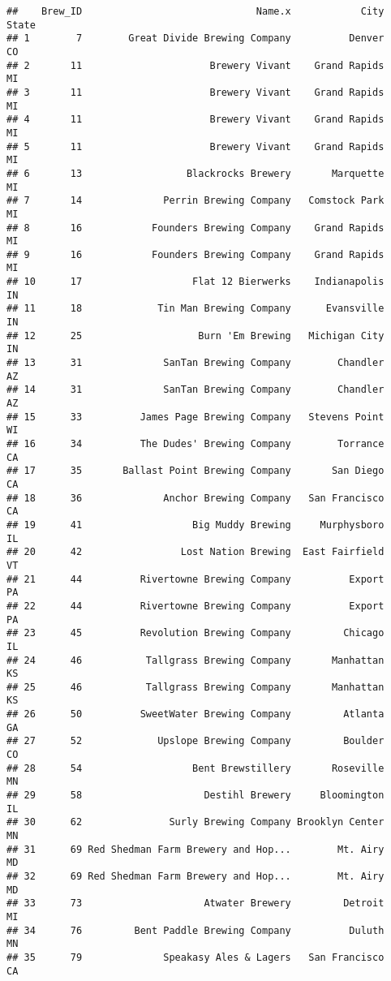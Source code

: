 \documentclass[
]{article}
\begin{document}
\begin{verbatim}
##    Brew_ID                              Name.x            City State
## 1        7        Great Divide Brewing Company          Denver    CO
## 2       11                      Brewery Vivant    Grand Rapids    MI
## 3       11                      Brewery Vivant    Grand Rapids    MI
## 4       11                      Brewery Vivant    Grand Rapids    MI
## 5       11                      Brewery Vivant    Grand Rapids    MI
## 6       13                  Blackrocks Brewery       Marquette    MI
## 7       14              Perrin Brewing Company   Comstock Park    MI
## 8       16            Founders Brewing Company    Grand Rapids    MI
## 9       16            Founders Brewing Company    Grand Rapids    MI
## 10      17                   Flat 12 Bierwerks    Indianapolis    IN
## 11      18             Tin Man Brewing Company      Evansville    IN
## 12      25                    Burn 'Em Brewing   Michigan City    IN
## 13      31              SanTan Brewing Company        Chandler    AZ
## 14      31              SanTan Brewing Company        Chandler    AZ
## 15      33          James Page Brewing Company   Stevens Point    WI
## 16      34          The Dudes' Brewing Company        Torrance    CA
## 17      35       Ballast Point Brewing Company       San Diego    CA
## 18      36              Anchor Brewing Company   San Francisco    CA
## 19      41                   Big Muddy Brewing     Murphysboro    IL
## 20      42                 Lost Nation Brewing  East Fairfield    VT
## 21      44          Rivertowne Brewing Company          Export    PA
## 22      44          Rivertowne Brewing Company          Export    PA
## 23      45          Revolution Brewing Company         Chicago    IL
## 24      46           Tallgrass Brewing Company       Manhattan    KS
## 25      46           Tallgrass Brewing Company       Manhattan    KS
## 26      50          SweetWater Brewing Company         Atlanta    GA
## 27      52             Upslope Brewing Company         Boulder    CO
## 28      54                   Bent Brewstillery       Roseville    MN
## 29      58                     Destihl Brewery     Bloomington    IL
## 30      62               Surly Brewing Company Brooklyn Center    MN
## 31      69 Red Shedman Farm Brewery and Hop...        Mt. Airy    MD
## 32      69 Red Shedman Farm Brewery and Hop...        Mt. Airy    MD
## 33      73                     Atwater Brewery         Detroit    MI
## 34      76         Bent Paddle Brewing Company          Duluth    MN
## 35      79              Speakasy Ales & Lagers   San Francisco    CA

\end{verbatim}
\end{document}
